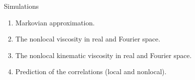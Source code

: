 \documentclass{beamer}
\begin{document}
 \begin{frame}{Simulations}
   \begin{enumerate}
     \item Markovian approximation.
     \item The nonlocal viscosity in real and Fourier space. 
     \item The nonlocal kinematic viscosity in real and Fourier space. 
     \item Prediction of the correlations (local and nonlocal). 
   \end{enumerate}
 \end{frame}
\end{document}
